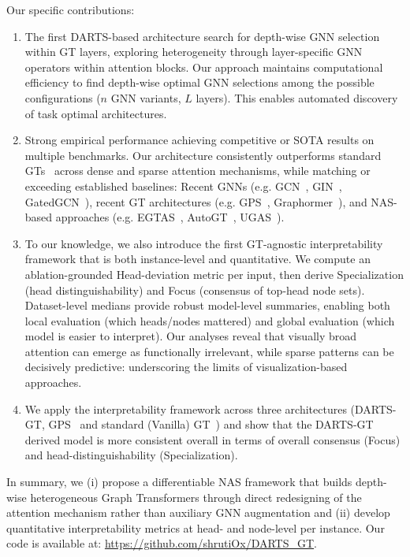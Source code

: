 \documentclass[lettersize,journal]{IEEEtran}
\begin{document}
Our specific contributions:
\begin{enumerate} 
    \item The first DARTS-based architecture search for depth-wise GNN selection within GT layers, exploring heterogeneity through layer-specific GNN operators within attention blocks. Our approach maintains computational efficiency to find depth-wise optimal GNN selections among the possible configurations ($n$ GNN variants, $L$ layers).  This enables automated  discovery of task optimal architectures.
    
    \item Strong empirical performance achieving competitive or SOTA results on multiple benchmarks. Our architecture consistently outperforms standard GTs~\cite{dwivedi_generalization_2021} across dense and sparse attention mechanisms, while matching or exceeding established baselines: Recent GNNs (e.g. GCN~\cite{kipf_semi-supervised_2017}, GIN~\cite{xu_how_2019}, GatedGCN~\cite{bresson_residual_2018}), recent GT architectures (e.g. GPS~\cite{rampa_recipe_nodate}, Graphormer~\cite{ying_transformers_2021}), and NAS-based approaches (e.g. EGTAS~\cite{wang_automatic_2024}, AutoGT~\cite{zhang_autogt_2023}, UGAS~\cite{song_towards_2025}).
    
    \item To our knowledge,  we also introduce the first GT-agnostic interpretability framework that is both instance-level and quantitative. We compute an ablation-grounded Head-deviation metric per input, then derive Specialization (head distinguishability) and Focus (consensus of top-head node sets). Dataset-level medians provide robust model-level summaries, enabling both local evaluation (which heads/nodes mattered) and global evaluation (which model is easier to interpret). Our analyses reveal that visually broad attention can emerge as functionally irrelevant, while sparse patterns can be decisively predictive: underscoring the limits of visualization-based approaches.
    
    \item We apply the interpretability framework across three architectures (DARTS-GT, GPS~\cite{rampa_recipe_nodate} and standard (Vanilla) GT~\cite{dwivedi_generalization_2021}) and show that the DARTS-GT derived model is more consistent overall in terms of overall consensus (Focus) and head-distinguishability (Specialization).
\end{enumerate}

In summary, we (i) propose a differentiable NAS framework that builds depth-wise heterogeneous Graph Transformers through direct redesigning of the attention mechanism rather than auxiliary GNN augmentation and (ii) develop quantitative interpretability metrics at head- and node-level per instance. 
Our code is available at: \href{https://github.com/shrutiOx/DARTS_GT}{https://github.com/shrutiOx/DARTS\_GT}.
\end{document}
